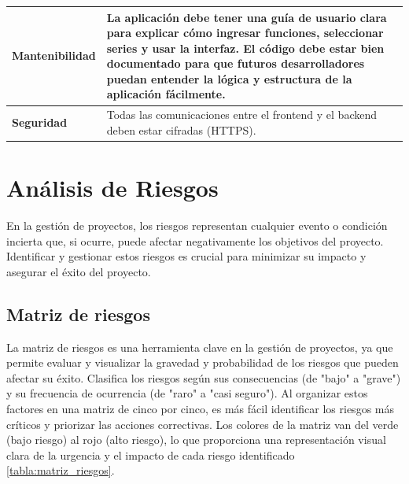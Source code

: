 \begin{longtable}{|m{5cm}|m{8.5cm}|}
	\textbf{Mantenibilidad} & La aplicación debe tener una guía de usuario clara para explicar cómo ingresar funciones, seleccionar series y usar la interfaz. El código debe estar bien documentado para que futuros desarrolladores puedan entender la lógica y estructura de la aplicación fácilmente. \\
	\hline
	
	\textbf{Seguridad} & Todas las comunicaciones entre el frontend y el backend deben estar cifradas (HTTPS). \\
	\hline
\end{longtable}
\caption{Tabla de requerimientos no funcionales} \label{tabla:RNF}
\vspace{0.5cm}



\section{Análisis de Riesgos}
En la gestión de proyectos, los riesgos representan cualquier evento o condición incierta que, si ocurre, puede afectar negativamente los objetivos del proyecto. Identificar y gestionar estos riesgos es crucial para minimizar su impacto y asegurar el éxito del proyecto. 
\subsection{Matriz de riesgos}
La matriz de riesgos es una herramienta clave en la gestión de proyectos, ya que permite evaluar y visualizar la gravedad y probabilidad de los riesgos que pueden afectar su éxito. Clasifica los riesgos según sus consecuencias (de "bajo" a "grave") y su frecuencia de ocurrencia (de "raro" a "casi seguro"). Al organizar estos factores en una matriz de cinco por cinco, es más fácil identificar los riesgos más críticos y priorizar las acciones correctivas. Los colores de la matriz van del verde (bajo riesgo) al rojo (alto riesgo), lo que proporciona una representación visual clara de la urgencia y el impacto de cada riesgo identificado \ref{tabla:matriz_riesgos}.

